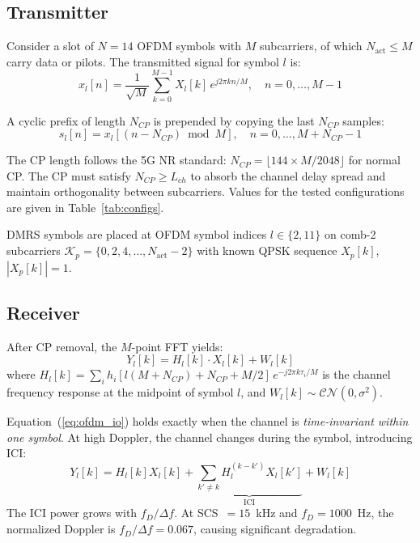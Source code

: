 \documentclass[11pt,a4paper,twoside]{article}
\newcommand{\CN}{\mathcal{CN}}
\begin{document}
\subsection{Transmitter}

Consider a slot of $N = 14$ OFDM symbols with $M$ subcarriers, of which $N_{\text{act}} \leq M$ carry data or pilots. The transmitted signal for symbol $l$ is:
\begin{equation}
    x_l[n] = \frac{1}{\sqrt{M}} \sum_{k=0}^{M-1} X_l[k] \, e^{j2\pi kn/M}, \quad n = 0, \ldots, M-1
\end{equation}

A cyclic prefix of length $N_{CP}$ is prepended by copying the last $N_{CP}$ samples:
\begin{equation}
    s_l[n] = x_l\!\left[(n - N_{CP}) \bmod M\right], \quad n = 0, \ldots, M + N_{CP} - 1
\end{equation}

The CP length follows the 5G NR standard: $N_{CP} = \lfloor 144 \times M / 2048 \rfloor$ for normal CP. The CP must satisfy $N_{CP} \geq L_{ch}$ to absorb the channel delay spread and maintain orthogonality between subcarriers. Values for the tested configurations are given in Table~\ref{tab:configs}.

DMRS symbols are placed at OFDM symbol indices $l \in \{2, 11\}$ on comb-2 subcarriers $\mathcal{K}_p = \{0, 2, 4, \ldots, N_{\text{act}}-2\}$ with known QPSK sequence $X_p[k]$, $|X_p[k]| = 1$.

\subsection{Receiver}

After CP removal, the $M$-point FFT yields:
\begin{equation}
    Y_l[k] = H_l[k] \cdot X_l[k] + W_l[k]
    \label{eq:ofdm_io}
\end{equation}
where $H_l[k] = \sum_{i} h_i[l(M+N_{CP})+N_{CP}+M/2] \, e^{-j2\pi k \tau_i / M}$ is the channel frequency response at the midpoint of symbol $l$, and $W_l[k] \sim \CN(0, \sigma^2)$.

Equation~(\ref{eq:ofdm_io}) holds exactly when the channel is \emph{time-invariant within one symbol}. At high Doppler, the channel changes during the symbol, introducing ICI:
\begin{equation}
    Y_l[k] = H_l[k] X_l[k] + \underbrace{\sum_{k' \neq k} H_l^{(k-k')} X_l[k']}_{\text{ICI}} + W_l[k]
\end{equation}
The ICI power grows with $f_D / \Delta f$. At SCS~$= 15$~kHz and $f_D = 1000$~Hz, the normalized Doppler is $f_D/\Delta f = 0.067$, causing significant degradation.
\end{document}
